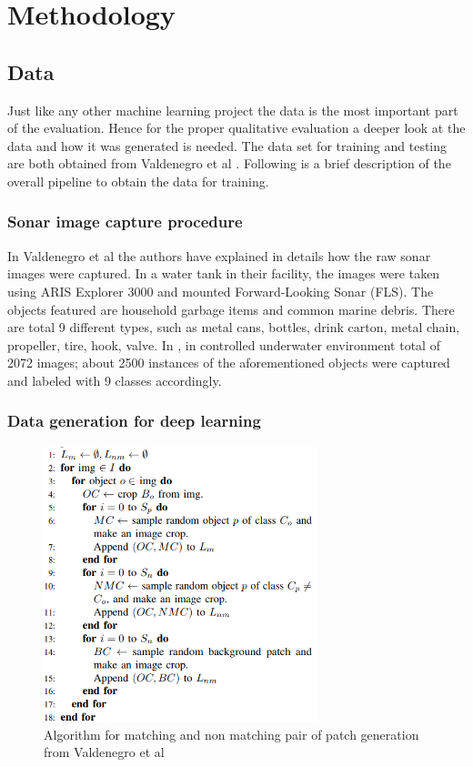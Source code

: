 \chapter{Methodology}

\section{Data}
Just like any other machine learning project the data is the most important part of the evaluation. Hence for the proper qualitative evaluation a deeper look at the data and how it was generated is needed.
The data set for training and testing are both obtained from Valdenegro et al \cite{stateoftheart}. Following is a brief description of the overall pipeline to obtain the data for training.

\subsection{Sonar image capture procedure}
In Valdenegro et al \cite{stateoftheart} the authors have explained in details how the raw sonar images were captured. In a water tank in their facility, the images were taken using ARIS Explorer 3000 and
mounted Forward-Looking Sonar (FLS). The objects featured are household garbage items and common marine debris. There are total 9 different types, such as metal cans, bottles, drink carton, metal chain, propeller, tire, hook, valve. 
In \cite{stateoftheart}, in controlled underwater environment total of 2072 images; about 2500 instances of the aforementioned objects were captured and labeled with 9 classes accordingly.

\subsection{Data generation for deep learning}
\begin{figure}[ht]
\centering
\includegraphics[height= 8cm]{images/densenet/training_data_generation}
\caption{Algorithm for matching and non matching pair of patch generation from Valdenegro et al \cite{stateoftheart}}
\label{fig:training_data_generation}
\end{figure}


